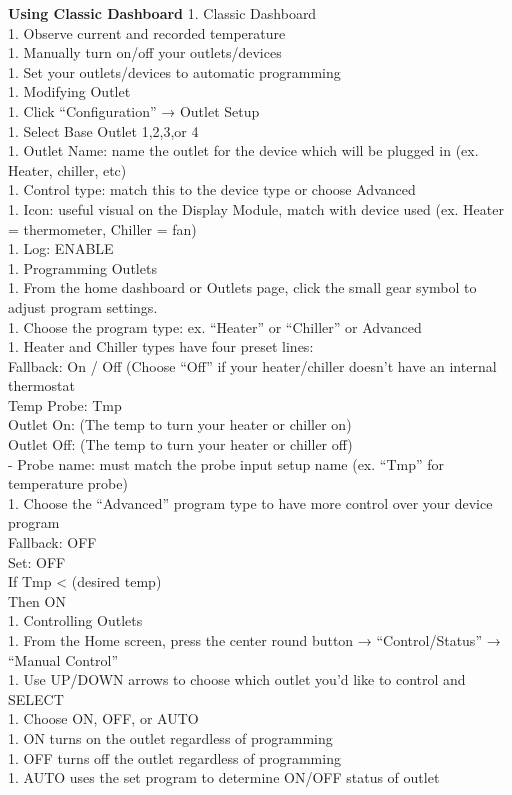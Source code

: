 \documentclass[
]{book}
\begin{document}
\textbf{Using Classic Dashboard}
1. Classic Dashboard\\
1. Observe current and recorded temperature\\
1. Manually turn on/off your outlets/devices\\
1. Set your outlets/devices to automatic programming\\
1. Modifying Outlet\\
1. Click ``Configuration'' → Outlet Setup\\
1. Select Base Outlet 1,2,3,or 4\\
1. Outlet Name: name the outlet for the device which will be plugged in (ex. Heater, chiller, etc)\\
1. Control type: match this to the device type or choose Advanced\\
1. Icon: useful visual on the Display Module, match with device used (ex. Heater = thermometer, Chiller = fan)\\
1. Log: ENABLE\\
1. Programming Outlets\\
1. From the home dashboard or Outlets page, click the small gear symbol to adjust program settings.\\
1. Choose the program type: ex. ``Heater'' or ``Chiller'' or Advanced\\
1. Heater and Chiller types have four preset lines:\\
Fallback: On / Off (Choose ``Off'' if your heater/chiller doesn't have an internal thermostat\\
Temp Probe: Tmp\\
Outlet On: (The temp to turn your heater or chiller on)\\
Outlet Off: (The temp to turn your heater or chiller off)\\
- Probe name: must match the probe input setup name (ex. ``Tmp'' for temperature probe)\\
1. Choose the ``Advanced'' program type to have more control over your device program\\
Fallback: OFF\\
Set: OFF\\
If Tmp \textless{} (desired temp)\\
Then ON\\
1. Controlling Outlets\\
1. From the Home screen, press the center round button → ``Control/Status'' → ``Manual Control''\\
1. Use UP/DOWN arrows to choose which outlet you'd like to control and SELECT\\
1. Choose ON, OFF, or AUTO\\
1. ON turns on the outlet regardless of programming\\
1. OFF turns off the outlet regardless of programming\\
1. AUTO uses the set program to determine ON/OFF status of outlet
\end{document}
